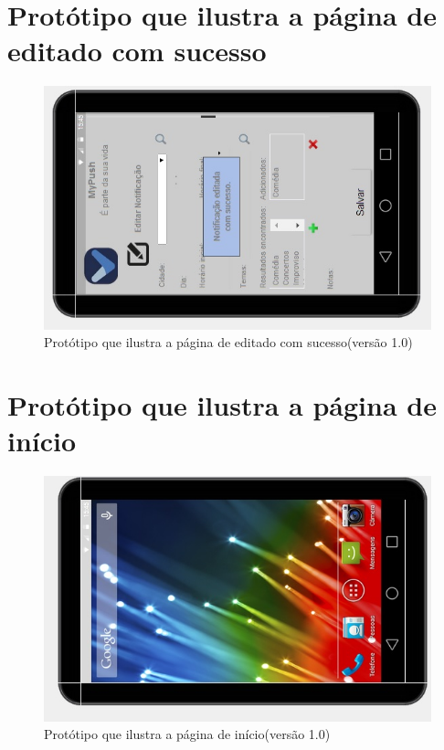 \begin{apendicesenv}
    \pagebreak
      \section*{Protótipo que ilustra a página de editado com sucesso}

    \begin{figure}[!htbp]
      \centering
      \includegraphics[scale=0.9, angle=-90]{editaveis/figuras/prototipo_alta_fidelidade_v1/1_15}
      \caption{Protótipo que ilustra a página de editado com sucesso(versão 1.0)}
      \label{v1}
    \end{figure}
    
    \pagebreak
      \section*{Protótipo que ilustra a página de início}

    \begin{figure}[!htbp]
      \centering
      \includegraphics[scale=0.9, angle=-90]{editaveis/figuras/prototipo_alta_fidelidade_v1/1_16}
      \caption{Protótipo que ilustra a página de início(versão 1.0)}
      \label{v1}
    \end{figure}




\end{apendicesenv}
